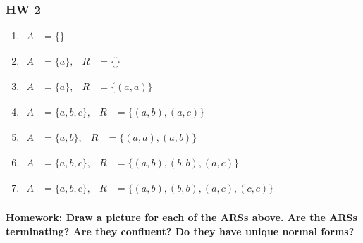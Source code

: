 \documentclass{article}
\theoremstyle{theorem}
\theoremstyle{definition}
\theoremstyle{remark}
\begin{document}
\subsubsection{HW 2}
\begin{enumerate}
  \item \(\begin{aligned}
           A &= \{\}
         \end{aligned}\)
         

  \item \(\begin{aligned}
           A &= \{a\}, & R &= \{\}
         \end{aligned}\)

  \item \(\begin{aligned}
           A &= \{a\}, & R &= \{(a,a)\}
         \end{aligned}\)

  \item \(\begin{aligned}
           A &= \{a,b,c\}, & R &= \{(a,b),(a,c)\}
         \end{aligned}\)

  \item \(\begin{aligned}
           A &= \{a,b\}, & R &= \{(a,a),(a,b)\}
         \end{aligned}\)

  \item \(\begin{aligned}
           A &= \{a,b,c\}, & R &= \{(a,b),(b,b),(a,c)\}
         \end{aligned}\)

  \item \(\begin{aligned}
           A &= \{a,b,c\}, & R &= \{(a,b),(b,b),(a,c),(c,c)\}
         \end{aligned}\)
\end{enumerate}


\paragraph{Homework: Draw a picture for each of the ARSs above. Are the ARSs terminating? Are they confluent? Do they have unique normal forms?}
\end{document}
